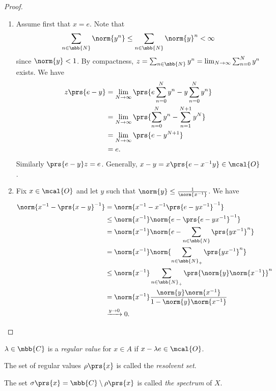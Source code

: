 \documentclass[10pt, twoside]{book}
\begin{document}
\begin{proof}
\begin{enumerate}
\item Assume first that $x = e$. Note that
\[\sum_{n \in \mbb{N}} \norm{y^n} \leq \sum_{n \in \mbb{N}} \norm{y}^n < \infty\]
since $\norm{y} < 1$. By compactness, $z = \sum_{n \in \mbb{N}} y^n = \lim_{N\to\infty} \sum_{n=0}^N y^n$ exists.
We have
\begin{align*}
z \prs{e-y} &= \lim_{N \to \infty} \prs{e \sum_{n=0}^N y^n - y \sum_{n=0}^N y^n}
\\&= \lim_{N\to\infty} \prs{\sum_{n=0}^N y^n - \sum_{n=1}^{N+1} y^N}
\\&= \lim_{N\to\infty} \prs{e - y^{N+1}}
\\&= e \text{.}
\end{align*}
Similarly $\prs{e-y} z = e$.
Generally, $x-y = x\prs{e - x^{-1} y} \in \mcal{O}$.
\item Fix $x \in \mcal{O}$ and let $y$ such that $\norm{y} \leq \frac{1}{\norm{x^{-1}}}$.
We have
\begin{align*}
\norm{x^{-1} - \prs{x-y}^{-1}} &= \norm{x^{-1} - x^{-1}\prs{e - yx^{-1}}^{-1}}
\\&\leq \norm{x^{-1}} \norm{e - \prs{e-yx^{-1}}^{-1}}
\\&= \norm{x^{-1}} \norm{e - \sum_{n \in \mbb{N}} \prs{yx^{-1}}^n}
\\&= \norm{x^{-1}} \norm{\sum_{n \in \mbb{N}_+} \prs{yx^{-1}}^n}
\\&\leq \norm{x^{-1}} \sum_{n \in \mbb{N}_+} \prs{\norm{y} \norm{x^{-1}}}^n
\\&= \norm{x^{-1}} \frac{\norm{y} \norm{x^{-1}}}{1 - \norm{y} \norm{x^{-1}}}
\\&\xrightarrow{y\to 0} 0 \text{.}
\end{align*}
\end{enumerate}
\end{proof}

\begin{definition}
$\lambda \in \mbb{C}$ is a \emph{regular value} for $x \in A$ if $x - \lambda e \in \mcal{O}$.
\end{definition}

\begin{definition}
The set of regular values $\rho\prs{x}$ is called the \emph{resolvent set}.
\end{definition}

\begin{definition}[Spectrum]
The set $\sigma\prs{x} = \mbb{C} \setminus \rho\prs{x}$ is called \emph{the spectrum} of $X$.
\end{definition}
\end{document}
